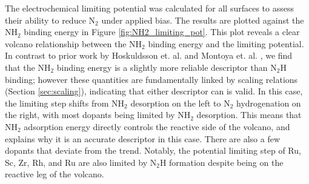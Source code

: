 

The electrochemical limiting potential was calculated for all surfaces to assess their ability to reduce N$_2$ under applied bias. The results are plotted against the NH$_2$ binding energy in Figure \ref{fig:NH2_limiting_pot}. This plot reveals a clear volcano relationship between the NH$_2$ binding energy and the limiting potential. In contrast to prior work by Hoskuldsson et. al.\cite{Hoskuldsson_2017} and Montoya et. al. \cite{Montoya_2015}, we find that the NH$_2$ binding energy is a slightly more reliable descriptor than N$_2$H binding; however these quantities are fundamentally linked by scaling relations (Section \ref{sec:scaling}), indicating that either descriptor can is valid. In this case, the limiting step shifts from NH$_2$ desorption on the left to N$_2$ hydrogenation on the right, with most dopants being limited by NH$_2$ desorption. This means that NH$_2$ adsorption energy directly controls the reactive side of the volcano, and explains why it is an accurate descriptor in this case. There are also a few dopants that deviate from the trend. 
Notably, the potential limiting step of  Ru, Sc, Zr, Rh, and Ru are also limited by N$_2$H formation despite being on the reactive leg of the volcano.

